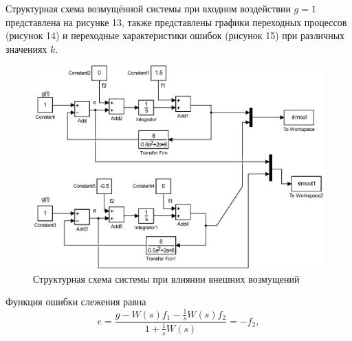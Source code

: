 \documentclass[12pt,a4paper]{article}
\begin{document}
Структурная схема возмущённой системы при входном воздействии $g=1$ представлена на рисунке 13, также представлены графики переходных процессов (рисунок 14) и переходные характеристики ошибок (рисунок 15) при различных значениях $k$.
\begin{figure}[H]
    \centering
    \includegraphics[width=1\linewidth]{scheme/scheme4.eps}
    \caption{Структурная схема системы при влиянии внешних возмущений}
\end{figure}
Функция ошибки слежения равна
\begin{equation}
e = {\frac{g - W(s)f_1 - \displaystyle{\frac{1}{s}}W(s)f_2}{1 + \displaystyle{\frac{1}{s}}W(s)}}=-f_2,
\end{equation}
\end{document}
